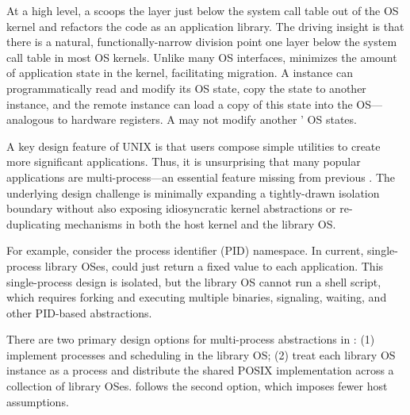 At a high level, a \libos{}
scoops the layer just below the system call table out of the OS kernel
and refactors the code as an application library.  
The driving insight is that there is a natural, functionally-narrow division point 
one layer below the system call table
in most OS kernels.
Unlike many OS interfaces, \thehostabi{} minimizes the amount of application state in the kernel, facilitating
migration. A \libos{} instance can programmatically read and modify its OS state, copy the state to another instance, and the remote instance can 
load a copy of this state into the OS---analogous to hardware registers.
A \picoproc{} may not modify another \picoprocs{}' OS states.



\label{sec:overview:libos:multiproc}


A key design feature of UNIX is that users compose simple utilities to create more significant applications.  Thus, it is unsurprising that many popular applications are multi-process---an essential feature missing from previous \liboses{}.
The underlying design challenge is minimally expanding a tightly-drawn isolation boundary without also exposing idiosyncratic kernel abstractions or re-duplicating mechanisms in both the host kernel and the library OS.


For example, consider the process identifier (PID) namespace. In current, single-process library OSes,  could just return a fixed value to each application.
This single-process design is isolated, but the library OS cannot run a shell script, which requires forking and executing multiple binaries, signaling, waiting, and other PID-based abstractions.

There are two primary design options for multi-process abstractions in \liboses{}: (1) implement processes and scheduling in 
the library OS; (2) treat each library OS instance as a process and distribute the shared POSIX implementation across a collection of library OSes.
\graphene{} follows the second option, which imposes fewer host assumptions.

